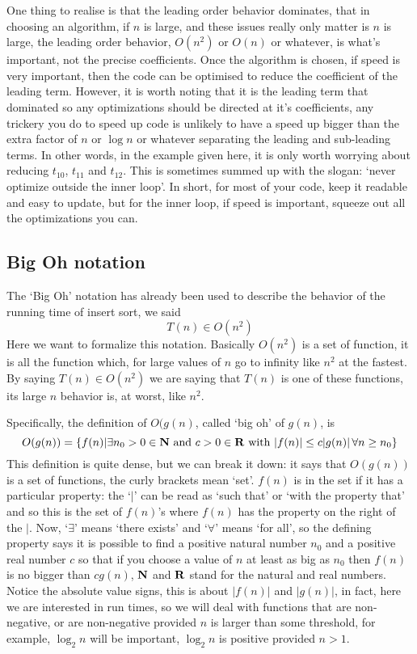 \documentclass[11pt,a4paper]{scrartcl}
\begin{document}
One thing to realise is that the leading order behavior dominates,
that in choosing an algorithm, if $n$ is large, and these issues
really only matter is $n$ is large, the leading order behavior,
$O(n^2)$ or $O(n)$ or whatever, is what's important, not the precise
coefficients. Once the algorithm is chosen, if speed is very
important, then the code can be optimised to reduce the coefficient of
the leading term. However, it is worth noting that it is the leading
term that dominated so any optimizations should be directed at it's
coefficients, any trickery you do to speed up code is unlikely to have
a speed up bigger than the extra factor of $n$ or $\log{n}$ or
whatever separating the leading and sub-leading terms. In other words,
in the example given here, it is only worth worrying about reducing
$t_{10}$, $t_{11}$ and $t_{12}$. This is sometimes summed up with the
slogan: \lq{}never optimize outside the inner loop\rq{}. In short, for
most of your code, keep it readable and easy to update, but for the
inner loop, if speed is important, squeeze out all the optimizations
you can.


\subsection*{Big Oh notation}

The \lq{}Big Oh\rq{} notation has already been used to describe the
behavior of the running time of insert sort, we said
\begin{equation}
T(n)\in O(n^2)
\end{equation}
Here we want to formalize this notation. Basically $O(n^2)$ is a set
of function, it is all the function which, for large values of $n$ go
to infinity like $n^2$ at the fastest. By saying $T(n)\in O(n^2)$ we
are saying that $T(n)$ is one of these functions, its large $n$
behavior is, at worst, like $n^2$. 

Specifically, the definition of $O(g(n)$, called \lq{}big oh\rq{} of
$g(n)$, is
\begin{equation}
O(g(n))=\{f(n)| \exists n_0>0\in {\bf N}\mbox{ and }c>0\in {\bf R}\mbox{ with }|f(n)|\le c|g(n)|\,\forall n\ge n_0\}
\end{equation}
This definition is quite dense, but we can break it down: it says that
$O(g(n))$ is a set of functions, the curly brackets mean
\lq{}set\rq{}. $f(n)$ is in the set if it has a particular
property: the \lq$|$\rq{} can be read as \lq{}such that\rq{} or
\lq{}with the property that\rq{} and so this is the set of $f(n)$'s
where $f(n)$ has the property on the right of the $|$. Now,
\lq{}$\exists$\rq{} means \lq{}there exists\rq{} and
\lq{}$\forall$\rq{} means \lq{}for all\rq{}, so the defining property
says it is possible to find a positive natural number $n_0$ and a
positive real number $c$ so that if you choose a value of $n$ at
least as big as $n_0$ then $f(n)$ is no bigger than $cg(n)$, ${\bf N}$
and ${\bf R}$ stand for the natural and real numbers. Notice the
absolute value signs, this is about $|f(n)|$ and $|g(n)|$, in fact,
here we are interested in run times, so we will deal with functions
that are non-negative, or are non-negative provided $n$ is larger than
some threshold, for example, $\log_2{n}$ will be important,
$\log_2{n}$ is positive provided $n>1$.
\end{document}
